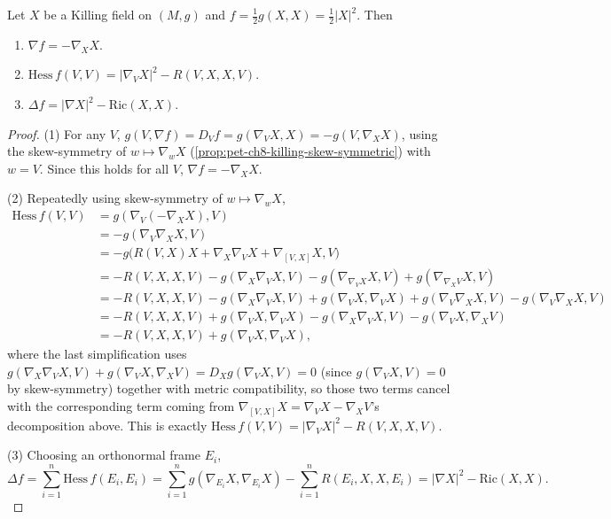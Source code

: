 \begin{proposition}[Proposition 8.2.1]
  \label{prop:pet-ch8-killing-norm-formulas}
  Let $X$ be a Killing field on $(M,g)$ and $f=\tfrac12g(X,X)=\tfrac12|X|^2$.
  Then
  \begin{enumerate}
    \item $\nabla f=-\nabla_XX$.
    \item $\mathrm{Hess}\,f(V,V)=|\nabla_VX|^2-R(V,X,X,V)$.
    \item $\Delta f=|\nabla X|^2-\mathrm{Ric}(X,X)$.
  \end{enumerate}
\end{proposition}
\begin{proof}
  (1) For any $V$, $g(V,\nabla f)=D_Vf=g(\nabla_VX,X)=-g(V,\nabla_XX)$, using the
  skew-symmetry of $w\mapsto\nabla_wX$ (\cref{prop:pet-ch8-killing-skew-symmetric})
  with $w=V$. Since this holds for all $V$, $\nabla f=-\nabla_XX$.

  (2) Repeatedly using skew-symmetry of $w\mapsto\nabla_wX$,
  \begin{align*}
    \mathrm{Hess}\,f(V,V)&=g(\nabla_V(-\nabla_XX),V)\\
    &=-g(\nabla_V\nabla_XX,V)\\
    &=-g\big(R(V,X)X+\nabla_X\nabla_VX+\nabla_{[V,X]}X,V\big)\\
    &=-R(V,X,X,V)-g(\nabla_X\nabla_VX,V)-g(\nabla_{\nabla_VX}X,V)+g(\nabla_{\nabla_XV}X,V)\\
    &=-R(V,X,X,V)-g(\nabla_X\nabla_VX,V)+g(\nabla_VX,\nabla_VX)+g(\nabla_V\nabla_XX,V)-g(\nabla_V\nabla_XX,V)\\
    &=-R(V,X,X,V)+g(\nabla_VX,\nabla_VX)-g(\nabla_X\nabla_VX,V)-g(\nabla_VX,\nabla_XV)\\
    &=-R(V,X,X,V)+g(\nabla_VX,\nabla_VX),
  \end{align*}
  where the last simplification uses $g(\nabla_X\nabla_VX,V)+g(\nabla_VX,\nabla_XV)
  = D_Xg(\nabla_VX,V)=0$ (since $g(\nabla_VX,V)=0$ by skew-symmetry) together
  with metric compatibility, so those two terms cancel with the corresponding
  term coming from $\nabla_{[V,X]}X=\nabla_VX-\nabla_XV$'s decomposition above.
  This is exactly $\mathrm{Hess}\,f(V,V)=|\nabla_VX|^2-R(V,X,X,V)$.

  (3) Choosing an orthonormal frame $E_i$,
  \[
    \Delta f=\sum_{i=1}^n\mathrm{Hess}\,f(E_i,E_i)
    =\sum_{i=1}^ng(\nabla_{E_i}X,\nabla_{E_i}X)-\sum_{i=1}^nR(E_i,X,X,E_i)
    =|\nabla X|^2-\mathrm{Ric}(X,X).
  \]
\end{proof}

